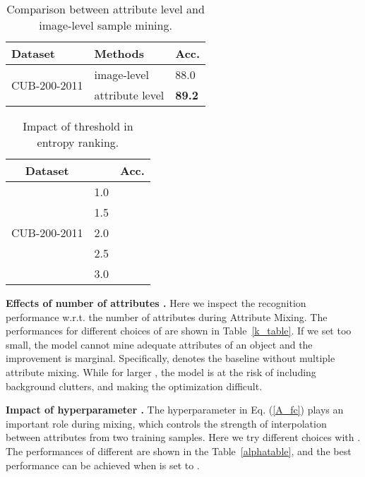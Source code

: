 \documentclass[runningheads]{llncs}
\begin{document}
\begin{table}[t]
\centering
\fontsize{9pt}{13pt}\selectfont
\setlength\tabcolsep{8pt}
 \caption{Comparison between attribute level and image-level sample mining.}
 \vspace{-0.2cm}
 \label{img_vs_attribute}
 \begin{tabular}{p{2.3cm}<{\centering}|p{2.3cm}<{\centering}|p{1.5cm}<{\centering}}
   \hline
   Dataset & Methods & Acc.\\ \hline
   \multirow{2}{*}{ CUB-200-2011} & image-level  & 88.0  \\
    & attribute level  & \textbf{89.2}  \\
   \hline

 \end{tabular}
 \end{table}


\begin{table}[t]
\centering

\fontsize{9pt}{13pt}\selectfont                         
\setlength\tabcolsep{8pt}
  \caption{Impact of threshold in entropy ranking.}
  \label{tau}
  \begin{tabular}{c|c|c}
    \hline
    Dataset &  & Acc.\\ \hline
    \multirow{5}{*}{ CUB-200-2011} & 1.0 &   \\
     & 1.5 & \textbf{} \\
     & 2.0 &  \\
     & 2.5 &  \\
     & 3.0 &  \\
    \hline

  \end{tabular}
  
  \end{table}


\textbf{Effects of number of attributes .}
Here we inspect the recognition performance w.r.t. the number of attributes  during Attribute Mixing. The performances for different choices of  are shown in Table~\ref{k_table}. If we set  too small, the model cannot mine adequate attributes of an object and the improvement is marginal. Specifically,  denotes the baseline without multiple attribute mixing. While for larger , the model is at the risk of including background clutters, and making the optimization difficult.

\textbf{Impact of hyperparameter .}
The hyperparameter  in Eq. (\ref{A_fc}) plays an important role during mixing, which controls the strength of interpolation between attributes from two training samples.  Here we try different choices with .  The performances of different  are shown in the Table~\ref{alphatable}, and the best performance can be achieved when  is set to . 
\end{document}
